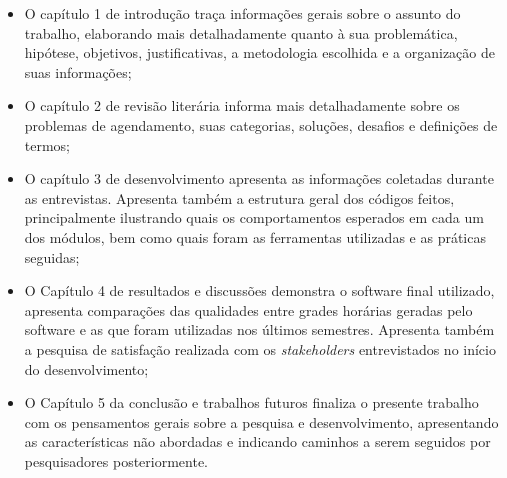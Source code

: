     \begin{itemize}
        \item O capítulo 1 de introdução traça informações gerais sobre o assunto do trabalho, elaborando mais detalhadamente quanto à sua problemática, hipótese, objetivos, justificativas, a metodologia escolhida e a organização de suas informações;
        \item O capítulo 2 de revisão literária informa mais detalhadamente sobre os problemas de agendamento, suas categorias, soluções, desafios e definições de termos;
        \item O capítulo 3 de desenvolvimento apresenta as informações coletadas durante as entrevistas. Apresenta também a estrutura geral dos códigos feitos, principalmente ilustrando quais os comportamentos esperados em cada um dos módulos, bem como quais foram as ferramentas utilizadas e as práticas seguidas;
        \item O Capítulo 4 de resultados e discussões demonstra o software final utilizado, apresenta comparações das qualidades entre grades horárias geradas pelo software e as que foram utilizadas nos últimos semestres. Apresenta também a pesquisa de satisfação realizada com os \textit{stakeholders} entrevistados no início do desenvolvimento;
        \item O Capítulo 5 da conclusão e trabalhos futuros finaliza o presente trabalho com os pensamentos gerais sobre a pesquisa e desenvolvimento, apresentando as características não abordadas e indicando caminhos a serem seguidos por pesquisadores posteriormente.
    \end{itemize}

